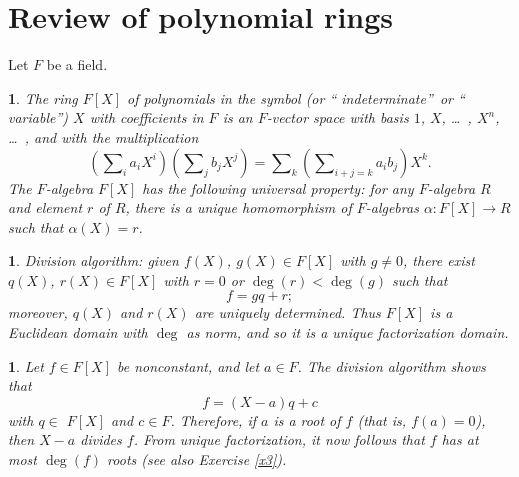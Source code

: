 \documentclass[a4paper,11pt,final,openany]{memoir}
\newtheorem{plain}[X]{}
\theoremstyle{nonumberplain}
\begin{document}
\section{Review of polynomial rings}

Let $F$ be a field.

\begin{plain}
\label{ef3a}The ring $F[X]$ of polynomials in the symbol (or \textquotedblleft
indeterminate\textquotedblright\ or \textquotedblleft
variable\textquotedblright) $X$ with coefficients in $F$ is an $F$-vector
space with basis $1$, $X$, \ldots\ , $X^{n}$, \ldots\ , and with the
multiplication
\[
\left(  \sum\nolimits_{i}a_{i}X^{i}\right)  \left(  \sum\nolimits_{j}%
b_{j}X^{j}\right)  =\sum\nolimits_{k}\left(  \sum\nolimits_{i+j=k}a_{i}%
b_{j}\right)  X^{k}.
\]
The $F$-algebra $F[X]$ has the following universal property: for any
$F$-algebra $R$ and element $r$ of $R$, there is a unique homomorphism of
$F$-algebras $\alpha\colon F[X]\rightarrow R$ such that $\alpha(X)=r$.
\end{plain}

\begin{plain}
\label{ef3b}\emph{Division algorithm\/}:%
given $f(X)$, $g(X)\in F[X]$ with $g\neq0$, there exist $q(X)$, $r(X)\in F[X]$
with $r=0$ or $\deg(r)<\deg(g)$ such that
\[
f=gq+r;
\]
moreover, $q(X)$ and $r(X)$ are uniquely determined. Thus $F[X]$ is a
Euclidean domain with $\deg$ as norm, and so it is a unique factorization domain.
\end{plain}

\begin{plain}
\label{ef3c}Let $f\in F[X]$ be nonconstant, and let $a\in F$. The division
algorithm shows that%
\[
f=(X-a)q+c
\]
with $q\in$ $F[X]$ and $c\in F$. Therefore, if $a$ is a
%
root of $f$ (that is, $f(a)=0$), then $X-a$ divides $f$. From unique
factorization, it now follows that $f$ has at most $\deg(f)$ roots (see also
Exercise \ref{x3}).
\end{plain}
\end{document}
